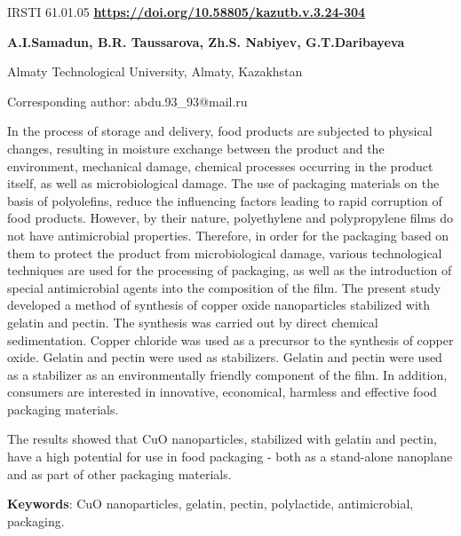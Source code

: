  \newpage
IRSTI 61.01.05
\hfill {\bfseries \href{https://doi.org/10.58805/kazutb.v.3.24-304}{https://doi.org/10.58805/kazutb.v.3.24-304}}


\begin{center}
{\bfseries A.I.Samadun\envelope, B.R. Taussarova, Zh.S. Nabiyev, G.T.Daribayeva}

Almaty Technological University, Almaty, Kazakhstan
\end{center}
\envelope Corresponding author: abdu.93\_93@mail.ru


In the process of storage and delivery, food products are subjected to
physical changes, resulting in moisture exchange between the product and
the environment, mechanical damage, chemical processes occurring in the
product itself, as well as microbiological damage. The use of packaging
materials on the basis of polyolefins, reduce the influencing factors
leading to rapid corruption of food products. However, by their nature,
polyethylene and polypropylene films do not have antimicrobial
properties. Therefore, in order for the packaging based on them to
protect the product from microbiological damage, various technological
techniques are used for the processing of packaging, as well as the
introduction of special antimicrobial agents into the composition of the
film. The present study developed a method of synthesis of copper oxide
nanoparticles stabilized with gelatin and pectin. The synthesis was
carried out by direct chemical sedimentation. Copper chloride was used
as a precursor to the synthesis of copper oxide. Gelatin and pectin were
used as stabilizers. Gelatin and pectin were used as a stabilizer as an
environmentally friendly component of the film. In addition, consumers
are interested in innovative, economical, harmless and effective food
packaging materials.

The results showed that CuO nanoparticles, stabilized with gelatin and
pectin, have a high potential for use in food packaging - both as a
stand-alone nanoplane and as part of other packaging materials.

{\bfseries Keywords}: CuO nanoparticles, gelatin, pectin, polylactide,
antimicrobial, packaging.


